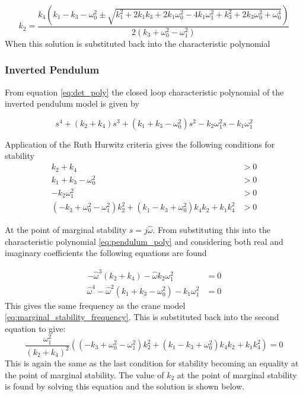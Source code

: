 \documentclass{article}
\begin{document}
\begin{equation}
  k_2 = \frac{k_{4} \left(k_{1} - k_{3} - \omega_{0}^{2} \pm \sqrt{k_{1}^{2} + 2 k_{1} k_{3} + 2 k_{1} \omega_{0}^{2} - 4 k_{1} \omega_{1}^{2} + k_{3}^{2} + 2 k_{3} \omega_{0}^{2} + \omega_{0}^{4}}\right)}{2 \left(k_{3} + \omega_{0}^{2} - \omega_{1}^{2}\right)}
\end{equation}
When this solution is substituted back into the characteristic polynomial

\subsubsection{Inverted Pendulum}

From equation \ref{eq:det_poly} the closed loop characteristic polynomial of the inverted pendulum model is given by

\begin{equation}
  s^{4} + \left(k_{2} + k_{4}\right) s^{3} + \left(k_{1} + k_{3} - \omega_{0}^{2}\right) s^{2} -  k_{2} \omega_{1}^{2} s -  k_{1} \omega_{1}^{2}
  \label{eq:pendulum_poly}
\end{equation}

Application of the Ruth Hurwitz criteria gives the following conditions for stability
\begin{align}
  k_{2} + k_{4} &> 0 \\
  k_{1} + k_{3} - \omega_{0}^{2} &> 0 \\
  - k_{2} \omega_{1}^{2} &> 0 \\
  \left(- k_{3} + \omega_{0}^{2} - \omega_{1}^{2}\right) k_{2}^{2} + \left(k_{1} - k_{3} + \omega_{0}^{2}\right) k_{4} k_{2} + k_{1} k_{4}^{2} &> 0
\end{align}

At the point of marginal stability $s = j\hat{\omega}$.
From substituting this into the characteristic polynomial \ref{eq:pendulum_poly} and considering both real and imaginary coefficients the following equations are found

\begin{align}
  - \hat{\omega}^{3} \left(k_{2} + k_{4}\right) - \hat{\omega} k_{2} \omega_{1}^{2} &= 0\\
  \hat{\omega}^{4} - \hat{\omega}^{2} \left(k_{1} + k_{3} - \omega_{0}^{2}\right) - k_{1} \omega_{1}^{2} &= 0
\end{align}
This gives the same frequency as the crane model \ref{eq:marginal_stability_frequency}. This is substituted back into the second equation to give:
\begin{equation}
  \frac{\omega_1^2}{(k_2 + k_4)^2} \left( \left(- k_{3} + \omega_{0}^{2} - \omega_{1}^{2}\right) k_{2}^{2} + \left(k_{1} - k_{3} + \omega_{0}^{2}\right) k_{4} k_{2} + k_{1} k_{4}^{2} \right) = 0
\end{equation}
This is again the same as the last condition for stability becoming an equality at the point of marginal stability.
The value of $k_2$ at the point of marginal stability is found by solving this equation and the solution is shown below.
\end{document}
